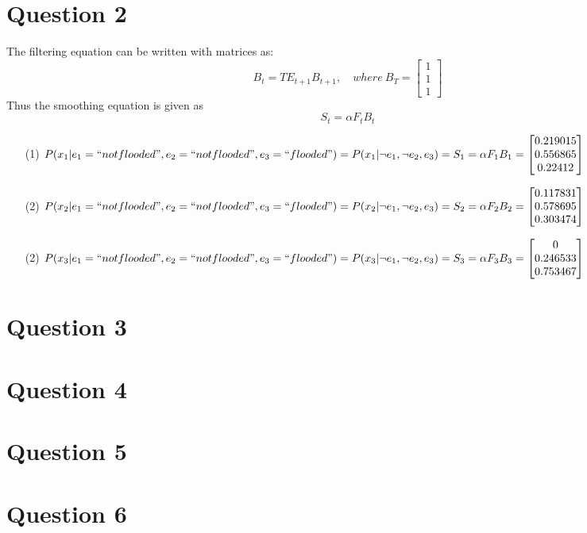 \documentclass[letter, 10pt]{article}
\begin{document}
\section*{Question 2} The filtering equation can be written with matrices as:
\begin{equation*}
    B_t = TE_{t+1}B_{t+1}, \quad where\ B_T = \begin{bmatrix}1\\1\\1\end{bmatrix}
\end{equation*}
Thus the smoothing equation is given as 
\begin{equation*}
    S_t = \alpha F_t B_t
\end{equation*}
\begin{itemize}
    \item[(1)] $P(x_1|e_1=``not flooded", e_2=``not flooded", e_3=``flooded") = P(x_1| \neg e_1, \neg e_2, e_3) = S_1 = \alpha F_1B_1 = 
    \begin{bmatrix}
        0.219015\\
        0.556865\\
        0.22412
    \end{bmatrix}$
    \item[(2)] $P(x_2|e_1=``not flooded", e_2=``not flooded", e_3=``flooded") = P(x_2| \neg e_1, \neg e_2, e_3) = S_2 = \alpha F_2B_2 = 
    \begin{bmatrix}
        0.117831\\
        0.578695\\
        0.303474
    \end{bmatrix}$
    \item[(2)] $P(x_3|e_1=``not flooded", e_2=``not flooded", e_3=``flooded") = P(x_3| \neg e_1, \neg e_2, e_3) = S_3 = \alpha F_3B_3 = 
    \begin{bmatrix}
        0\\
        0.246533\\
        0.753467
    \end{bmatrix}$
\end{itemize}
\section*{Question 3}
\section*{Question 4}
\section*{Question 5}
\section*{Question 6}
\end{document}
